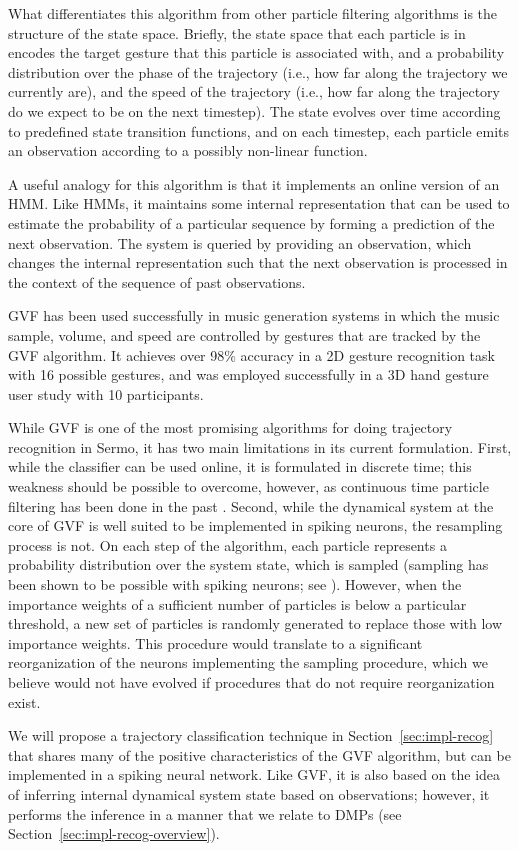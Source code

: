 What differentiates this algorithm from
other particle filtering algorithms
is the structure of the state space.
Briefly, the state space that each particle is in
encodes the target gesture that this particle
is associated with,
and a probability distribution
over the phase of the trajectory
(i.e., how far along the trajectory
we currently are),
and the speed of the trajectory
(i.e., how far along the trajectory
do we expect to be on the next timestep).
The state evolves over time according to
predefined state transition functions,
and on each timestep,
each particle emits an observation
according to a possibly non-linear function.

A useful analogy for this algorithm
is that it implements an online version of an HMM.
Like HMMs, it maintains some internal representation
that can be used to estimate the probability
of a particular sequence
by forming a prediction
of the next observation.
The system is queried by providing
an observation,
which changes the internal representation
such that the next observation
is processed in the context of
the sequence of past observations.

GVF has been used successfully
in music generation systems
in which the music sample,
volume, and speed are
controlled by gestures
that are tracked by the GVF algorithm.
It achieves over 98\% accuracy
in a 2D gesture recognition task
with 16 possible gestures,
and was employed successfully
in a 3D hand gesture user study
with 10 participants.

While GVF is one of the most promising
algorithms for doing trajectory recognition
in Sermo,
it has two main limitations in its current formulation.
First, while the classifier can be used online,
it is formulated in discrete time;
this weakness should be possible to overcome,
however, as continuous time particle filtering
has been done in the past
\citep{ng2005}.
Second, while the dynamical system
at the core of GVF is well suited
to be implemented in spiking neurons,
the resampling process is not.
On each step of the algorithm,
each particle represents a probability
distribution over the system state,
which is sampled
(sampling has been shown to be
possible with spiking neurons;
see \citealt{buesing2011}).
However, when the importance weights
of a sufficient number of particles
is below a particular threshold,
a new set of particles
is randomly generated
to replace those with low importance weights.
This procedure would translate to
a significant reorganization
of the neurons implementing
the sampling procedure,
which we believe
would not have evolved if
procedures that do not require
reorganization exist.

We will propose a trajectory classification technique
in Section~\ref{sec:impl-recog}
that shares many of the positive
characteristics of the GVF algorithm,
but can be implemented in a spiking neural network.
Like GVF, it is also based on the idea
of inferring internal dynamical system state
based on observations;
however, it performs the inference
in a manner that we relate to
DMPs (see Section~\ref{sec:impl-recog-overview}).
